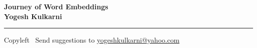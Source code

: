 
\graphicspath{{images/}}

\footnotesize


\begin{center}
\Large{\textbf{Journey of Word Embeddings\\ Yogesh Kulkarni}}  
\end{center}

\begin{multicols}{2}
% 

\end{multicols}

\rule{\linewidth}{0.25pt}
\scriptsize
Copyleft \textcopyleft\  Send suggestions to 
\href{http://yati.io}{yogeshkulkarni@yahoo.com}


